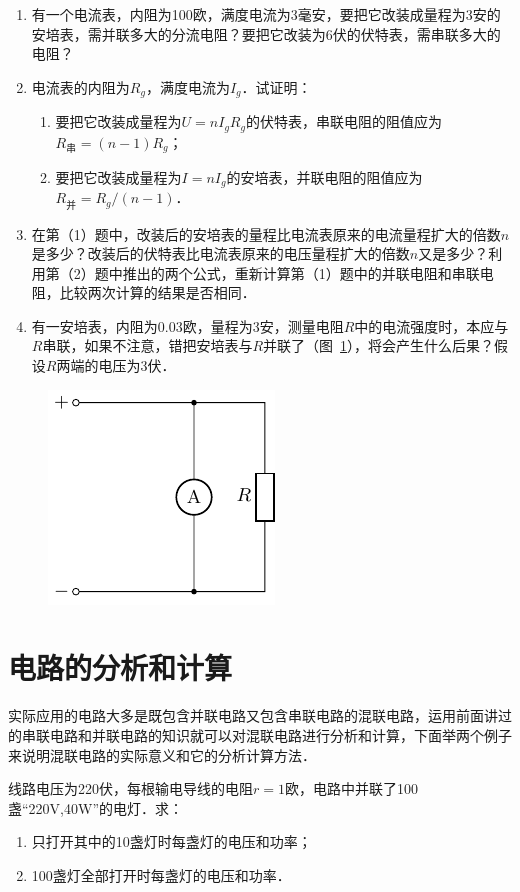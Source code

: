 \begin{enumerate}
    \item 有一个电流表，内阻为100欧，满度电流为3毫安，要把它改装成量程为3安的安培表，需并联多大的分流电阻？要把它改装为6伏的伏特表，需串联多大的电阻？
    \item 电流表的内阻为$R_g$，满度电流为$I_g$．试证明：
     \begin{enumerate}
         \item 要把它改装成量程为$U=nI_gR_g$的伏特表，串联电阻的阻值应为$R_{\text{串}}=(n-1)R_g$；
         \item 要把它改装成量程为$I=nI_g$的安培表，并联电阻的阻值应为$R_{\text{并}}=R_g/(n-1)$．
     \end{enumerate}
     \item 在第（1）题中，改装后的安培表的量程比电流表原来的电流量程扩大的倍数$n$是多少？改装后的伏特表比电流表原来的电压量程扩大的倍数$n$又是多少？利用第（2）题中推出的两个公式，重新计算第（1）题中的并联电阻和串联电阻，比较两次计算的结果是否相同．
     \item 有一安培表，内阻为0.03欧，量程为3安，测量电阻$R$中的电流强度时，本应与$R$串联，如果不注意，错把安培表与$R$并联了（图~\ref{fig_B_7-18}），将会产生什么后果？假设$R$两端的电压为3伏．
\end{enumerate}
\begin{figure}[htbp]
    \centering
    \includegraphics{fig/B/7-18.pdf}
    \caption{}\label{fig_B_7-18}
\end{figure}

\section{电路的分析和计算}

实际应用的电路大多是既包含并联电路又包含串联电路的混联电路，运用前面讲过的串联电路和并联电路的知识就可以对混联电路进行分析和计算，下面举两个例子来说明混联电路的实际意义和它的分析计算方法．

\begin{example}
    线路电压为220伏，每根输电导线的电阻$r=1$欧，电路中并联了100盏“220V,40W”的电灯．求：
    \begin{enumerate}
        \item 只打开其中的10盏灯时每盏灯的电压和功率；
        \item 100盏灯全部打开时每盏灯的电压和功率．
    \end{enumerate}
\end{example}


